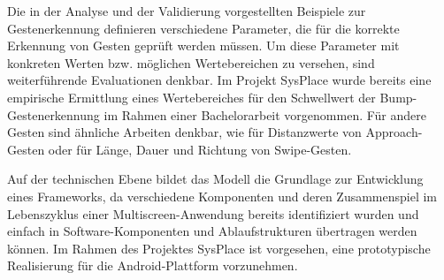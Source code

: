 Die in der Analyse und der Validierung vorgestellten Beispiele zur Gestenerkennung definieren verschiedene Parameter, die für die korrekte Erkennung von Gesten geprüft werden müssen. Um diese Parameter mit konkreten Werten bzw. möglichen Wertebereichen zu versehen, sind weiterführende Evaluationen denkbar. Im Projekt SysPlace wurde bereits eine empirische Ermittlung eines Wertebereiches für den Schwellwert der Bump-Gestenerkennung im Rahmen einer Bachelorarbeit vorgenommen. Für andere Gesten sind ähnliche Arbeiten denkbar, wie \zb für Dis\-tanz\-wer\-te von Approach-Gesten oder für Länge, Dauer und Richtung von Swipe-Gesten.

Auf der technischen Ebene bildet das Modell die Grundlage zur Entwicklung eines Frameworks, da verschiedene Komponenten und deren Zusammenspiel im Lebenszyklus einer Multiscreen-Anwendung bereits identifiziert wurden und einfach in Software-Komponenten und Ablaufstrukturen übertragen werden können. Im Rahmen des Projektes SysPlace ist vorgesehen, eine prototypische Realisierung für die Android-Plattform vorzunehmen.


\label{lastpage}

\cleardoublepage

\singlespacing

\setcounter{page}{\value{frontmatterpage}}



\cleardoublepage
{}
{}
\listoftables

\cleardoublepage
{}
{}
\listoffigures

\begin{flushleft}
\end{flushleft}

\cleardoublepage
{}
{}
\printindex

